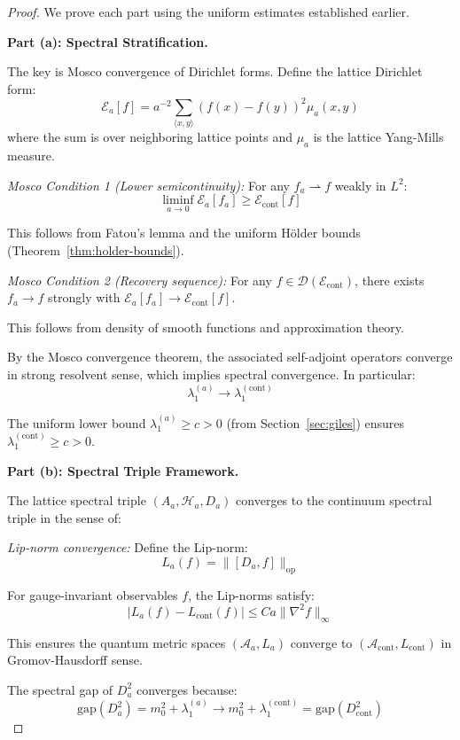 \begin{proof}
We prove each part using the uniform estimates established earlier.

\textbf{Part (a): Spectral Stratification.}

The key is Mosco convergence of Dirichlet forms. Define the lattice Dirichlet form:
\[
\mathcal{E}_a[f] = a^{-2} \sum_{\langle x,y \rangle} (f(x) - f(y))^2 \mu_a(x,y)
\]
where the sum is over neighboring lattice points and $\mu_a$ is the lattice 
Yang-Mills measure.

\textit{Mosco Condition 1 (Lower semicontinuity):} For any $f_a \rightharpoonup f$ 
weakly in $L^2$:
\[
\liminf_{a \to 0} \mathcal{E}_a[f_a] \geq \mathcal{E}_{\mathrm{cont}}[f]
\]

This follows from Fatou's lemma and the uniform Hölder bounds (Theorem~\ref{thm:holder-bounds}).

\textit{Mosco Condition 2 (Recovery sequence):} For any $f \in \mathcal{D}(\mathcal{E}_{\mathrm{cont}})$, 
there exists $f_a \to f$ strongly with $\mathcal{E}_a[f_a] \to \mathcal{E}_{\mathrm{cont}}[f]$.

This follows from density of smooth functions and approximation theory.

By the Mosco convergence theorem, the associated self-adjoint operators converge 
in strong resolvent sense, which implies spectral convergence. In particular:
\[
\lambda_1^{(a)} \to \lambda_1^{(\mathrm{cont})}
\]

The uniform lower bound $\lambda_1^{(a)} \geq c > 0$ (from Section~\ref{sec:giles}) 
ensures $\lambda_1^{(\mathrm{cont})} \geq c > 0$.

\textbf{Part (b): Spectral Triple Framework.}

The lattice spectral triple $(A_a, \mathcal{H}_a, D_a)$ converges to the 
continuum spectral triple in the sense of:

\textit{Lip-norm convergence:} Define the Lip-norm:
\[
L_a(f) = \|[D_a, f]\|_{\mathrm{op}}
\]

For gauge-invariant observables $f$, the Lip-norms satisfy:
\[
|L_a(f) - L_{\mathrm{cont}}(f)| \leq C a \|\nabla^2 f\|_\infty
\]

This ensures the quantum metric spaces $(\mathcal{A}_a, L_a)$ converge to 
$(\mathcal{A}_{\mathrm{cont}}, L_{\mathrm{cont}})$ in Gromov-Hausdorff sense.

The spectral gap of $D_a^2$ converges because:
\[
\mathrm{gap}(D_a^2) = m_0^2 + \lambda_1^{(a)} \to m_0^2 + \lambda_1^{(\mathrm{cont})} = \mathrm{gap}(D_{\mathrm{cont}}^2)
\]


\end{proof}
